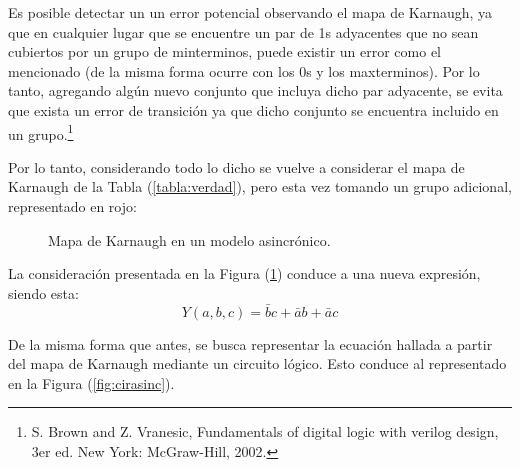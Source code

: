 Es posible detectar un un error potencial observando el mapa de Karnaugh, ya que en cualquier lugar que se encuentre un par de 1s adyacentes que no sean cubiertos por un grupo de minterminos, puede existir un error como el mencionado (de la misma forma ocurre con los 0s y los maxterminos). Por lo tanto, agregando algún nuevo conjunto que incluya dicho par adyacente, se evita que exista un error de transición ya que dicho conjunto se encuentra incluido en un grupo.\footnote{S. Brown and Z. Vranesic, Fundamentals of digital logic with verilog design, 3er ed. New York: McGraw-Hill, 2002.}

Por lo tanto, considerando todo lo dicho se vuelve a considerar el mapa de Karnaugh de la Tabla (\ref{tabla:verdad}), pero esta vez tomando un grupo adicional, representado en rojo:
\begin{figure}[H]
\begin{centering}
    \begin{Karnaughvuit}
        
    \end{Karnaughvuit}
\par\end{centering}
\centering
\caption{Mapa de Karnaugh en un modelo asincrónico.}
\label{fig:karasinc}
\end{figure}

La consideración presentada en la Figura (\ref{fig:karasinc}) conduce a una nueva expresión, siendo esta:
\begin{equation}
	Y \left( a,b,c \right) = \bar{b} c + \bar{a} b + \bar{a} c
	\label{equ:karasinc}
\end{equation}

De la misma forma que antes, se busca representar la ecuación hallada a partir del mapa de Karnaugh mediante un circuito lógico. Esto conduce al representado en la Figura (\ref{fig:cirasinc}).

